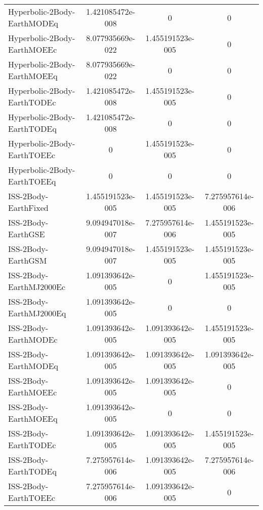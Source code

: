 \begin{table}[htbp!]
\begin{tabular}{lccc}
         Hyperbolic-2Body-EarthMODEq & 1.421085472e-008 & 0 & 0 \\
         Hyperbolic-2Body-EarthMOEEc & 8.077935669e-022 & 1.455191523e-005 & 0 \\
         Hyperbolic-2Body-EarthMOEEq & 8.077935669e-022 & 0 & 0 \\
         Hyperbolic-2Body-EarthTODEc & 1.421085472e-008 & 1.455191523e-005 & 0 \\
         Hyperbolic-2Body-EarthTODEq & 1.421085472e-008 & 0 & 0 \\
         Hyperbolic-2Body-EarthTOEEc & 0 & 1.455191523e-005 & 0 \\
         Hyperbolic-2Body-EarthTOEEq & 0 & 0 & 0 \\
         ISS-2Body-EarthFixed & 1.455191523e-005 & 1.455191523e-005 & 7.275957614e-006 \\
         ISS-2Body-EarthGSE & 9.094947018e-007 & 7.275957614e-006 & 1.455191523e-005 \\
         ISS-2Body-EarthGSM & 9.094947018e-007 & 1.455191523e-005 & 1.455191523e-005 \\
         ISS-2Body-EarthMJ2000Ec & 1.091393642e-005 & 0 & 1.455191523e-005 \\
         ISS-2Body-EarthMJ2000Eq & 1.091393642e-005 & 0 & 0 \\
         ISS-2Body-EarthMODEc & 1.091393642e-005 & 1.091393642e-005 & 1.455191523e-005 \\
         ISS-2Body-EarthMODEq & 1.091393642e-005 & 1.091393642e-005 & 1.091393642e-005 \\
         ISS-2Body-EarthMOEEc & 1.091393642e-005 & 1.091393642e-005 & 0 \\
         ISS-2Body-EarthMOEEq & 1.091393642e-005 & 0 & 0 \\
         ISS-2Body-EarthTODEc & 1.091393642e-005 & 1.091393642e-005 & 1.455191523e-005 \\
         ISS-2Body-EarthTODEq & 7.275957614e-006 & 1.091393642e-005 & 7.275957614e-006 \\
         ISS-2Body-EarthTOEEc & 7.275957614e-006 & 1.091393642e-005 & 0 \\

\end{tabular}
\end{table}
